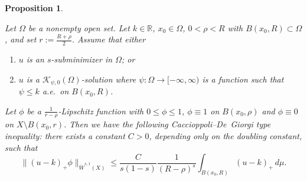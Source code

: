 \documentclass[10pt,a4paper]{amsart}
\newtheorem{proposition}{Proposition}
\begin{document}
	\begin{proposition}\label{lem2.2-13oct}
		
		
		Let $\Omega$ be a nonempty open set.
		Let $k\in\mathbb{R}$, $x_0\in \Omega$, $0<\rho<R$ with $B(x_0,R)\subset \Omega$, and set $r:=\frac{R+\rho}{2}$.
		Assume that either
		\begin{enumerate}
			\item \label{item-a}
			$u$ is an $s$-subminimizer 
			{in $\Omega$; or }
			\item \label{item-b}
			$u$ is a $\mathcal{K}_{\psi,0}(\Omega)$-solution where $\psi:\Omega\to[-\infty,\infty)$ is a function such that $\psi\leq k$
			a.e.\ on $B(x_0,R)$.
		\end{enumerate}
		Let $\phi$ be a $\frac{1}{r-\rho}$-Lipschitz function with $0\leq \phi\leq 1$, $\phi\equiv 1 $ on $B(x_0,\rho)$ and $\phi\equiv  0$ on $ X\setminus B(x_0,r)$.
		Then we have the following Caccioppoli--De~Giorgi type inequality:  
		there exists a constant $C>0$, depending only on the doubling constant, such that
		\begin{equation}\label{eq3.2-15mar}
			\|(u-k)_+\phi\|_{\dot W^{s,1}(X)}
			\leq 
			\frac{C}{s(1-s)}
			\frac{1}{(R-\rho)^s}
			\int_{B(x_0,R)} (u-k)_+\, d\mu.
		\end{equation}
		
	\end{proposition}
\end{document}
